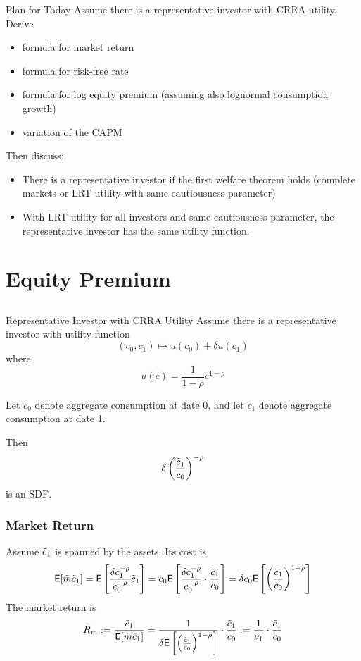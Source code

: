 \documentclass[xcolor=dvipsnames,10pt]{beamer}
\begin{document}
 \begin{frame}{Plan for Today}
     Assume there is a representative investor with CRRA utility.  Derive
     \begin{itemize}
         \item formula for market return 
         \item formula for risk-free rate
         \item formula for log equity premium (assuming also lognormal consumption growth)
         \item variation of the CAPM
     \end{itemize}
     
Then discuss:
\begin{itemize}
    \item There is a representative investor if the first welfare theorem holds (complete markets or LRT utility with same cautiousness parameter)
    \item With LRT utility for all investors and same cautiousness parameter, the representative investor has the same utility function.
\end{itemize}
 \end{frame}

\section{Equity Premium}\subsection{}
\begin{frame}{Representative Investor with CRRA Utility}
    Assume there is a representative investor with utility function
      $$(c_0,c_1) \mapsto u(c_0) + \delta u(c_1)$$
      where
      $$u(c) = \frac{1}{1-\rho}c^{1-\rho}$$
      
      Let $c_0$ denote aggregate consumption at date 0, and let $\tilde{c}_1$ denote aggregate consumption at date 1.
      
      Then
      $$\delta \left(\frac{\tilde{c}_1}{c_0}\right)^{-\rho}$$
      is an SDF.
     \end{frame}

\bfr\frametitle{Market Return}
 Assume $\tilde{c}_1$ is spanned by the assets.  Its cost is 
$$\mathsf{E}[\tilde{m}\tilde{c}_1]= \mathsf{E}\left[\frac{\delta \tilde{c}_1^{-\rho}}{c_0^{-\rho}}\tilde{c}_1\right] = c_0\mathsf{E}\left[\frac{\delta \tilde{c}_1^{-\rho}}{c_0^{-\rho}}\cdot\frac{\tilde{c}_1}{c_0}\right] = \delta c_0\mathsf{E}\left[\left(\frac{\tilde{c}_1}{c_0}\right)^{1-\rho}\right]$$
 The market return is 
 $$\widetilde{R}_m := \frac{\tilde{c}_1 }{ \mathsf{E}[\tilde{m}\tilde{c}_1]} = \frac{1}{\delta\mathsf{E}\left[\left(\frac{\tilde{c}_1}{c_0}\right)^{1-\rho}\right]}\cdot \frac{\tilde{c}_1}{c_0} := \frac{1}{\nu_1} \cdot \frac{\tilde{c}_1}{c_0}$$
 
\end{document}
